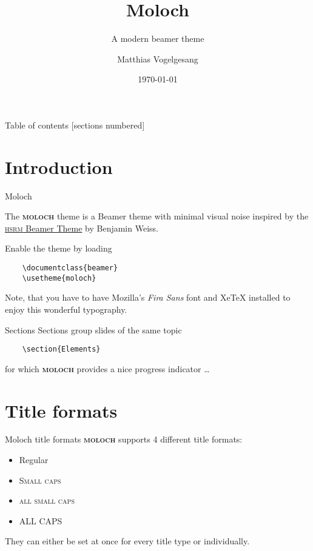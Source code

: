 \documentclass[10pt]{beamer}
\title{Moloch}
\subtitle{A modern beamer theme}
\date{\today}
\author{Matthias Vogelgesang}
\institute{Center for modern beamer themes}
\newcommand{\themename}{\textbf{\textsc{moloch}}\xspace}
\begin{document}
\maketitle

\begin{frame}{Table of contents}
  [sections numbered]
  \tableofcontents[hideallsubsections]
\end{frame}

\section{Introduction}

\begin{frame}[fragile]{Moloch}

  The \themename theme is a Beamer theme with minimal visual noise
  inspired by the \href{https://github.com/hsrmbeamertheme/hsrmbeamertheme}{\textsc{hsrm} Beamer
    Theme} by Benjamin Weiss.

  Enable the theme by loading

  \begin{verbatim}    \documentclass{beamer}
    \usetheme{moloch}\end{verbatim}

  Note, that you have to have Mozilla's \emph{Fira Sans} font and XeTeX
  installed to enjoy this wonderful typography.
\end{frame}
\begin{frame}[fragile]{Sections}
  Sections group slides of the same topic

  \begin{verbatim}    \section{Elements}\end{verbatim}

  for which \themename provides a nice progress indicator \ldots
\end{frame}

\section{Title formats}

\begin{frame}{Moloch title formats}
  \themename supports 4 different title formats:
  \begin{itemize}
    \item Regular
    \item \textsc{Small caps}
    \item \textsc{all small caps}
    \item ALL CAPS
  \end{itemize}
  They can either be set at once for every title type or individually.
\end{frame}
\end{document}
